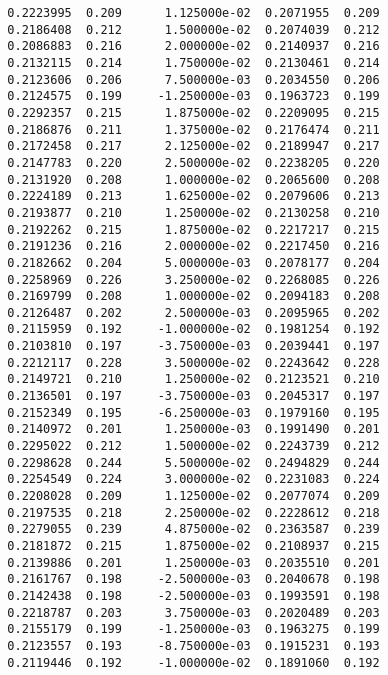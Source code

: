 \documentclass[
  letterpaper,
  DIV=11,
  numbers=noendperiod]{scrartcl}
\begin{document}
\begin{verbatim}
  0.2223995  0.209      1.125000e-02  0.2071955  0.209           
  0.2186408  0.212      1.500000e-02  0.2074039  0.212           
  0.2086883  0.216      2.000000e-02  0.2140937  0.216           
  0.2132115  0.214      1.750000e-02  0.2130461  0.214           
  0.2123606  0.206      7.500000e-03  0.2034550  0.206           
  0.2124575  0.199     -1.250000e-03  0.1963723  0.199           
  0.2292357  0.215      1.875000e-02  0.2209095  0.215           
  0.2186876  0.211      1.375000e-02  0.2176474  0.211           
  0.2172458  0.217      2.125000e-02  0.2189947  0.217           
  0.2147783  0.220      2.500000e-02  0.2238205  0.220           
  0.2131920  0.208      1.000000e-02  0.2065600  0.208           
  0.2224189  0.213      1.625000e-02  0.2079606  0.213           
  0.2193877  0.210      1.250000e-02  0.2130258  0.210           
  0.2192262  0.215      1.875000e-02  0.2217217  0.215           
  0.2191236  0.216      2.000000e-02  0.2217450  0.216           
  0.2182662  0.204      5.000000e-03  0.2078177  0.204           
  0.2258969  0.226      3.250000e-02  0.2268085  0.226           
  0.2169799  0.208      1.000000e-02  0.2094183  0.208           
  0.2126487  0.202      2.500000e-03  0.2095965  0.202           
  0.2115959  0.192     -1.000000e-02  0.1981254  0.192           
  0.2103810  0.197     -3.750000e-03  0.2039441  0.197           
  0.2212117  0.228      3.500000e-02  0.2243642  0.228           
  0.2149721  0.210      1.250000e-02  0.2123521  0.210           
  0.2136501  0.197     -3.750000e-03  0.2045317  0.197           
  0.2152349  0.195     -6.250000e-03  0.1979160  0.195           
  0.2140972  0.201      1.250000e-03  0.1991490  0.201           
  0.2295022  0.212      1.500000e-02  0.2243739  0.212           
  0.2298628  0.244      5.500000e-02  0.2494829  0.244           
  0.2254549  0.224      3.000000e-02  0.2231083  0.224           
  0.2208028  0.209      1.125000e-02  0.2077074  0.209           
  0.2197535  0.218      2.250000e-02  0.2228612  0.218           
  0.2279055  0.239      4.875000e-02  0.2363587  0.239           
  0.2181872  0.215      1.875000e-02  0.2108937  0.215           
  0.2139886  0.201      1.250000e-03  0.2035510  0.201           
  0.2161767  0.198     -2.500000e-03  0.2040678  0.198           
  0.2142438  0.198     -2.500000e-03  0.1993591  0.198           
  0.2218787  0.203      3.750000e-03  0.2020489  0.203           
  0.2155179  0.199     -1.250000e-03  0.1963275  0.199           
  0.2123557  0.193     -8.750000e-03  0.1915231  0.193           
  0.2119446  0.192     -1.000000e-02  0.1891060  0.192           

\end{verbatim}
\end{document}
